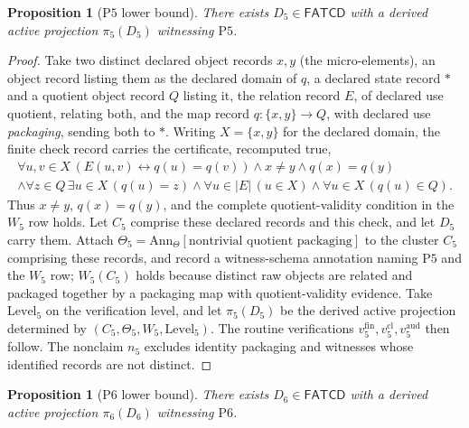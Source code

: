 \documentclass[11pt]{article}
\newtheorem{proposition}[theorem]{Proposition}
\theoremstyle{definition}
\newcommand{\FATCD}{\ensuremath{\mathsf{FATCD}}}
\newcommand{\Pfive}{\ensuremath{\mathrm{P5}}}
\newcommand{\Psix}{\ensuremath{\mathrm{P6}}}
\begin{document}
\begin{proposition}[\Pfive{} lower bound]\label{prop:p5-witness}
There exists \(D_5 \in \FATCD{}\) with a derived active projection
\(\pi_5(D_5)\) witnessing \Pfive{}.
\end{proposition}

\begin{proof}
Take two distinct declared object records \(x,y\) (the micro-elements), an object record
listing them as the declared domain of \(q\), a declared state record \(*\) and a
quotient object record \(Q\) listing it, the relation record \(E\), of declared use
quotient, relating both, and the map record \(q:\{x,y\}\to Q\), with declared use \emph{packaging}, sending both to \(*\). Writing \(X=\{x,y\}\) for the declared domain, the finite check
record carries the certificate, recomputed true,
\begin{multline*}\forall u,v\in X\,(E(u,v)\leftrightarrow q(u)=q(v))\wedge x\ne y\wedge q(x)=q(y)\\ \wedge\forall z\in Q\,\exists u\in X\,(q(u)=z)\wedge\forall u\in|E|\,(u\in X)\wedge\forall u\in X\,(q(u)\in Q).\end{multline*} Thus
\(x\ne y\), \(q(x)=q(y)\), and the complete quotient-validity condition in the
\(W_5\) row holds. Let \(C_5\) comprise these declared records and this check,
and let \(D_5\) carry them. Attach
\(\Theta_5 = \mathrm{Ann}_\Theta[\text{nontrivial quotient packaging}]\)
to the cluster \(C_5\) comprising these records, and record a
witness-schema annotation naming \Pfive{} and the \(W_5\) row; \(W_5(C_5)\)
holds because distinct raw objects are related and packaged together by a
packaging map with quotient-validity evidence. Take
\(\mathrm{Level}_5\) on the verification level, and let \(\pi_5(D_5)\)
be the derived active projection determined by
\((C_5,\Theta_5,W_5,\mathrm{Level}_5)\). The routine verifications
\(v_5^{\mathrm{fin}}, v_5^{\mathrm{cl}}, v_5^{\mathrm{aud}}\) then
follow. The nonclaim \(n_5\) excludes identity packaging and
witnesses whose identified records are not distinct.
\end{proof}

\begin{proposition}[\Psix{} lower bound]\label{prop:p6-witness}
There exists \(D_6 \in \FATCD{}\) with a derived active projection
\(\pi_6(D_6)\) witnessing \Psix{}.
\end{proposition}
\end{document}
